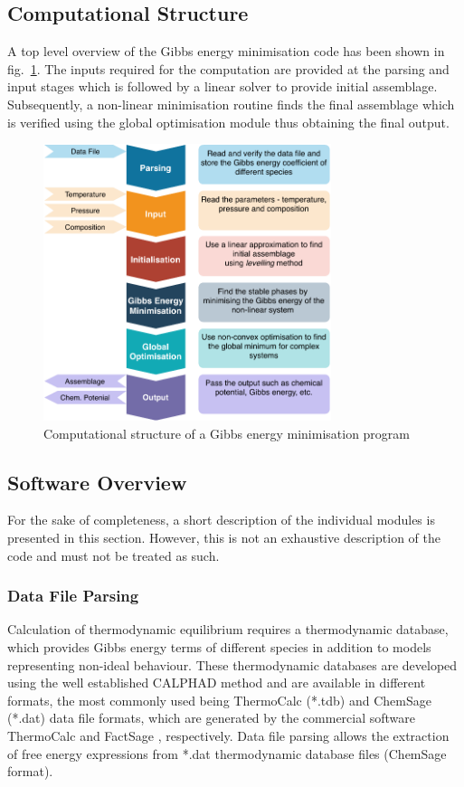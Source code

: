 \subsection*{Computational Structure}
  	A top level overview  of the  Gibbs energy minimisation code has been shown in fig.~\ref{fig:gemsolverintro}. The inputs required for the computation are provided at the parsing and input stages which is followed by a linear solver to provide initial assemblage. Subsequently, a non-linear minimisation routine finds the final assemblage which is verified using the global optimisation module thus obtaining the final output.
    	\begin{figure}[h]
        		\centering
        		\includegraphics[width=0.75\textwidth]{figures/YJ_structure.pdf}
        		\caption{Computational structure of a Gibbs energy minimisation program}
        		\label{fig:gemsolverintro}
    	\end{figure}
    
\subsection*{Software Overview}
    	For the sake of completeness, a short description of the individual modules is presented in this section. However, this is not an exhaustive description of the  code and must not be treated as such.
    	\subsubsection*{Data File Parsing}
    	Calculation of thermodynamic equilibrium requires a thermodynamic database, which provides Gibbs energy terms of different species in addition to models representing non-ideal behaviour. These thermodynamic databases are developed using the well established CALPHAD method \cite{liu_wang_2016} and are available in different formats, the most commonly used being ThermoCalc (*.tdb) and ChemSage (*.dat) data file formats, which are generated by the commercial software ThermoCalc \cite{ANDERSSON2002273} and FactSage \cite{BALE201635}, respectively. Data file parsing allows the extraction of free energy expressions from *.dat thermodynamic database files (ChemSage format).
	

